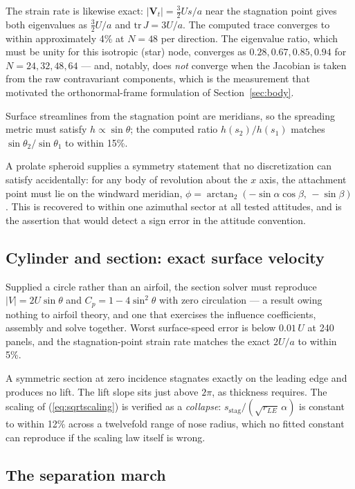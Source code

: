\documentclass[submit]{aiaa-tc}%
\newcommand{\eqnref}[1]{(\ref{#1})}
\begin{document}
The strain rate is likewise exact: $|\mathbf{V}_t| = \tfrac32 U s/a$ near
the stagnation point gives both eigenvalues as $\tfrac32 U/a$ and
$\mathrm{tr}\,J = 3U/a$. The computed trace converges to within
approximately 4\% at $N = 48$ per direction. The eigenvalue ratio, which
must be unity for this isotropic (star) node, converges as
$0.28, 0.67, 0.85, 0.94$ for $N = 24, 32, 48, 64$ --- and, notably, does
\emph{not} converge when the Jacobian is taken from the raw contravariant
components, which is the measurement that motivated the orthonormal-frame
formulation of Section~\ref{sec:body}.

Surface streamlines from the stagnation point are meridians, so the
spreading metric must satisfy $h \propto \sin\theta$; the computed ratio
$h(s_2)/h(s_1)$ matches $\sin\theta_2/\sin\theta_1$ to within 15\%.

A prolate spheroid supplies a symmetry statement that no discretization
can satisfy accidentally: for any body of revolution about the $x$ axis,
the attachment point must lie on the windward meridian,
$\phi = \arctan_2(-\sin\alpha\cos\beta,\,-\sin\beta)$. This is recovered
to within one azimuthal sector at all tested attitudes, and is the
assertion that would detect a sign error in the attitude convention.

\subsection{Cylinder and section: exact surface velocity}

Supplied a circle rather than an airfoil, the section solver must
reproduce $|V| = 2U\sin\theta$ and $C_p = 1 - 4\sin^2\theta$ with zero
circulation --- a result owing nothing to airfoil theory, and one that
exercises the influence coefficients, assembly and solve together. Worst
surface-speed error is below $0.01\,U$ at 240 panels, and the
stagnation-point strain rate matches the exact $2U/a$ to within 5\%.

A symmetric section at zero incidence stagnates exactly on the leading
edge and produces no lift. The lift slope sits just above $2\pi$, as
thickness requires. The scaling of \eqnref{eq:sqrtscaling} is verified as
a \emph{collapse}: $s_{\text{stag}}/(\sqrt{r_{LE}}\,\alpha)$ is constant
to within 12\% across a twelvefold range of nose radius, which no fitted
constant can reproduce if the scaling law itself is wrong.

\subsection{The separation march}
\end{document}
